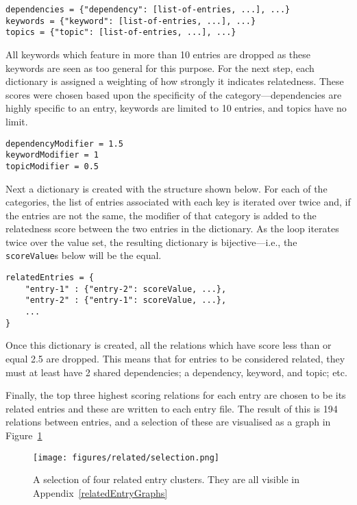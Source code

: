 \documentclass[bsc,frontabs,oneside,singlespacing,parskip,deptreport,logo]{infthesis}
\begin{document}
{\footnotesize
\begin{verbatim}
dependencies = {"dependency": [list-of-entries, ...], ...}
keywords = {"keyword": [list-of-entries, ...], ...}
topics = {"topic": [list-of-entries, ...], ...}
\end{verbatim}
}

All keywords which feature in more than 10 entries are dropped as these keywords are seen as too general for this purpose. For the next step, each dictionary is assigned a weighting of how strongly it indicates relatedness. These scores were chosen based upon the specificity of the category---dependencies are highly specific to an entry, keywords are limited to 10 entries, and topics have no limit. 

{\footnotesize
\begin{verbatim}
dependencyModifier = 1.5
keywordModifier = 1
topicModifier = 0.5
\end{verbatim}
}

Next a dictionary is created with the structure shown below. For each of the categories, the list of entries associated with each key is iterated over twice and, if the entries are not the same, the modifier of that category is added to the relatedness score between the two entries in the dictionary. As the loop iterates twice over the value set, the resulting dictionary is bijective---i.e., the \texttt{scoreValue}s below will be the equal.

{\footnotesize
\begin{verbatim}
relatedEntries = {
    "entry-1" : {"entry-2": scoreValue, ...},
    "entry-2" : {"entry-1": scoreValue, ...},
    ...
}
\end{verbatim}
}

Once this dictionary is created, all the relations which have score less than or equal 2.5 are dropped. This means that for entries to be considered related, they must at least have 2 shared dependencies; a dependency, keyword, and topic; etc.

Finally, the top three highest scoring relations for each entry are chosen to be its related entries and these are written to each entry file. The result of this is 194 relations between entries, and a selection of these are visualised as a graph in Figure~\ref{fig:related}

\begin{figure}[h]
    \centering
    \texttt{[image: figures/related/selection.png]}
    \caption{A selection of four related entry clusters. They are all visible in Appendix~\ref{relatedEntryGraphs}}
    \label{fig:related}
\end{figure}
\end{document}
